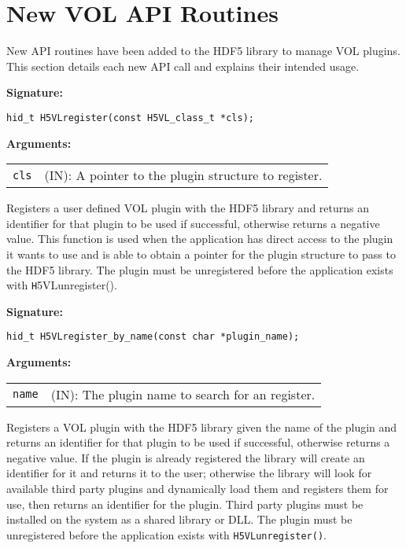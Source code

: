 \section{New VOL API Routines}
\label{sec:api}
New API routines have been added to the HDF5 library to manage VOL plugins. This section details each new API call and explains their intended usage.

\begin{mdframed}[style=bgbox]
\textbf{Signature:}
\begin{lstlisting}
hid_t H5VLregister(const H5VL_class_t *cls);
\end{lstlisting}

\textbf{Arguments:}\\
\begin{tabular}{l p{13.5cm}}
  {\tt cls} & (IN): A pointer to the plugin structure to register.\\
\end{tabular}
\end{mdframed}

Registers a user defined VOL plugin with the HDF5 library and returns an identifier for that plugin to be used if successful, otherwise returns a negative value. This function is used when the application has direct access to the plugin it wants to use and is able to obtain a pointer for the plugin structure to pass to the HDF5 library. The plugin must be unregistered before the application exists with {\texttt H5VLunregister()}.\bigskip


\begin{mdframed}[style=bgbox]
\textbf{Signature:}
\begin{lstlisting}
hid_t H5VLregister_by_name(const char *plugin_name);
\end{lstlisting}
\textbf{Arguments:}\\
\begin{tabular}{l p{13.5cm}}
  {\tt name} & (IN): The plugin name to search for an register.\\
\end{tabular}
\end{mdframed}
Registers a VOL plugin with the HDF5 library given the name of the plugin and returns an identifier for that plugin to be used if successful, otherwise returns a negative value. If the plugin is already registered the library will create an identifier for it and returns it to the user; otherwise the library will look for available third party plugins and dynamically load them and registers them for use, then returns an identifier for the plugin. Third party plugins must be installed on the system as a shared library or DLL. The plugin must be unregistered before the application exists with {\tt H5VLunregister()}.\bigskip

